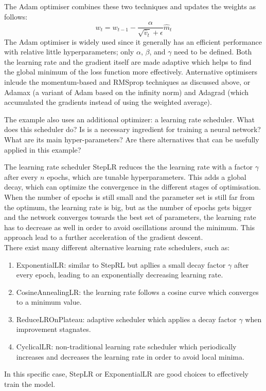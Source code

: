\documentclass[we,twoside,openright,a4paper,11pt]{uantwerpenbamathesis}
\begin{document}
The Adam optimiser combines these two techniques and updates the weights as follows:
\begin{equation}\label{eq:adam_update}
    w_t=w_{t-1}-\frac{\alpha}{\sqrt{\hat v_t}+\epsilon} \hat m_t
\end{equation}
The Adam optimiser is widely used since it generally has an efficient performance with relative little hyperparameters; only $\alpha$, $\beta$, and $\gamma$ need to be defined. Both the learning rate and the gradient itself are made adaptive which helps to find the global minimum of the loss function more effectively. Anternative optimisers inlcude the momentum-based and RMSprop techniques as discussed above, or Adamax (a variant of Adam based on the infinity norm) and Adagrad (which accumulated the gradients instead of using the weighted average).

\begin{tcolorbox}[title=Question 7, colback=blue!10!white, colframe=blue!40!white, sharp corners]
    The example also uses an additional optimizer: a learning rate scheduler. What does this scheduler do? Is is a necessary ingredient for training a neural network? What are its main hyper-parameters? Are there alternatives that can be usefully applied in this example?
\end{tcolorbox}
The learning rate scheduler StepLR reduces the the learning rate with a factor $\gamma$ after every $n$ epochs, which are tunable hyperparameters. This adds a global decay, which can optimize the convergence in the different stages of optimisation. When the number of epochs is still small and the parameter set is still far from the optimum, the learning rate is big, but as the number of epochs gets bigger and the network converges towards the best set of parameters, the learning rate has to decrease as well in order to avoid oscillations around the minimum. This approach lead to a further acceleration of the gradient descent.\\

There exist many different alternative learning rate schedulers, such as:
\begin{enumerate}
    \item ExponentialLR: similar to StepRL but apllies a small decay factor $\gamma$ after every epoch, leading to an exponentially decreasing learning rate.
    \item CosineAnnealingLR: the learning rate follows a cosine curve which converges to a minimum value.
    \item ReduceLROnPlateau: adaptive scheduler which applies a decay factor $\gamma$ when improvement stagnates.
    \item CyclicalLR: non-traditional learning rate scheduler which periodically increases and decreases the learning rate in order to avoid local minima.
\end{enumerate}
In this specific case, StepLR or ExponentialLR are good choices to effectively train the model. 
\end{document}
